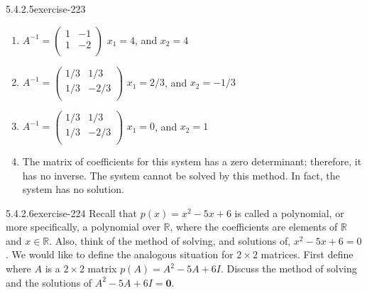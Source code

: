 \documentclass[twoside,10pt,]{book}
\numberwithin{equation}{section}
\begin{document}
\begin{divisionsolution}{5.4.2.5}{}{exercise-223}
\begin{enumerate}[label=(\alph*)]
\item\hypertarget{li-1029}{}\(A^{-1}=\left(
\begin{array}{cc}
1 & -1 \\
1 & -2 \\
\end{array}
\right)\)  \(x_1=4\), and \(x_2=4\)%
\item\hypertarget{li-1030}{}\(A^{-1}=\left(
\begin{array}{cc}
1/3 & 1/3 \\
1/3 & -2/3 \\
\end{array}
\right)\)  \(x_1=2/3\), and \(x_2=-1/3\)%
\item\hypertarget{li-1031}{}\(A^{-1}=\left(
\begin{array}{cc}
1/3 & 1/3 \\
1/3 & -2/3 \\
\end{array}
\right)\)  \(x_1=0\), and \(x_2=1\)%
\item\hypertarget{li-1032}{}The matrix of coefficients for this system has a zero determinant; therefore, it has no inverse. The system cannot be solved by this method. In fact, the system has no solution.%
\end{enumerate}
%
\end{divisionsolution}%
\begin{divisionsolution}{5.4.2.6}{}{exercise-224}%
\hypertarget{p-1924}{}%
Recall that \(p(x) = x^2- 5x + 6\) is called a polynomial, or more specifically, a polynomial over \(\mathbb{R}\), where the coefficients are elements of \(\mathbb{R}\) and \(x \in  \mathbb{R}\). Also, think of the method of solving, and solutions of, \(x^2- 5x + 6= 0\). We would like to define the analogous situation for \(2\times 2\) matrices. First define where \(A\) is a \(2\times 2\) matrix \(p(A) =
A^2 - 5A + 6I\). Discuss the method of solving and the solutions of \(A^2 - 5A + 6I=\pmb{0}\).%
\end{divisionsolution}%
\end{document}

